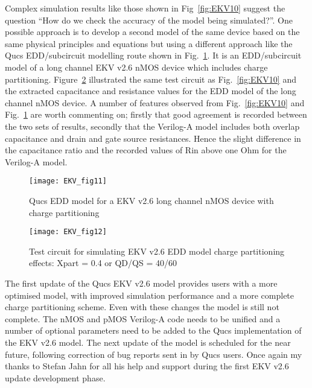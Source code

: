 Complex simulation results like those shown in Fig~\ref{fig:EKV10}
suggest the question ``How do we check the accuracy of the model being
simulated?''. One possible approach is to develop a second model of
the same device based on the same physical principles and equations
but using a different approach like the Qucs EDD/subcircuit modelling
route shown in Fig.~\ref{fig:EKV11}. It is an EDD/subcircuit model of
a long channel EKV v2.6 nMOS device which includes charge
partitioning. Figure~\ref{fig:EKV12} illustrated the same test circuit
as Fig.~\ref{fig:EKV10} and the extracted capacitance and resistance
values for the EDD model of the long channel nMOS device. A number of
features observed from Fig.~\ref{fig:EKV10} and Fig.~\ref{fig:EKV11}
are worth commenting on; firstly that good agreement is recorded
between the two sets of results, secondly that the Verilog-A model
includes both overlap capacitance and drain and gate source
resistances. Hence the slight difference in the capacitance ratio and
the recorded values of Rin above one Ohm for the Verilog-A model.

\begin{figure}
  \centering
  \texttt{[image: EKV\_fig11]}
  \caption{Qucs EDD model for a EKV v2.6 long channel nMOS device with charge partitioning}
  \label{fig:EKV11}
\end{figure}  

\begin{figure}
  \centering
  \texttt{[image: EKV\_fig12]}
  \caption{Test circuit for simulating EKV v2.6 EDD model charge partitioning effects: Xpart = 0.4 or QD/QS = 40/60}
  \label{fig:EKV12}
\end{figure}  


The first update of the Qucs EKV v2.6 model provides users with a more
optimised model, with improved simulation performance and a more
complete charge partitioning scheme.  Even with these changes the
model is still not complete. The nMOS and pMOS Verilog-A code needs to
be unified and a number of optional parameters need to be added to the
Qucs implementation of the EKV v2.6 model.  The next update of the
model is scheduled for the near future, following correction of bug
reports sent in by Qucs users.  Once again my thanks to Stefan Jahn
for all his help and support during the first EKV v2.6 update
development phase.
